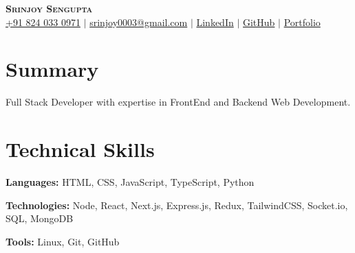 \documentclass[letterpaper,11pt]{article}
\newcommand{\resumeSubHeadingListStart}{\begin{itemize}[leftmargin=0.15in, label={}]}
\newcommand{\resumeSubHeadingListEnd}{\end{itemize}}
\begin{document}

\begin{center}
    \textbf{\Huge \scshape Srinjoy Sengupta} \\ \vspace{3pt}
    \small
    \faMobile \hspace{.5pt} \href{tel:918240330971}{+91 824 033 0971}
    $|$
    \faAt \hspace{.5pt} \href{srinjoy003@gmail.com}{srinjoy0003@gmail.com}
    $|$
    \faLinkedinSquare \hspace{.5pt} \href{https://linkedin.com/in/srinjoy-sengupta-b28565302}{LinkedIn}
    $|$
    \faGithub \hspace{.5pt} \href{https://github.com/Srinjoy003}{GitHub}
    $|$
    \faGlobe \hspace{.5pt} \href{https://srinjoysengupta.vercel.app/}{Portfolio}
\end{center}


\section{Summary}
  \vspace{2pt}
  \small{
  Full Stack Developer with expertise in FrontEnd and Backend Web Development.
  }




\section{Technical Skills}
  \vspace{2pt}
  \resumeSubHeadingListStart
    \small{\item{
        
        \textbf{Languages:}{ HTML, CSS, JavaScript, TypeScript, Python} \\ \vspace{3pt}
        
        \textbf{Technologies:}{ Node, React, Next.js, Express.js, Redux, TailwindCSS, Socket.io, SQL, MongoDB } \\ \vspace{3pt}
        
        \textbf{Tools:}{ Linux, Git, GitHub} \\ \vspace{3pt}
        
    }}
  \resumeSubHeadingListEnd
\end{document}

